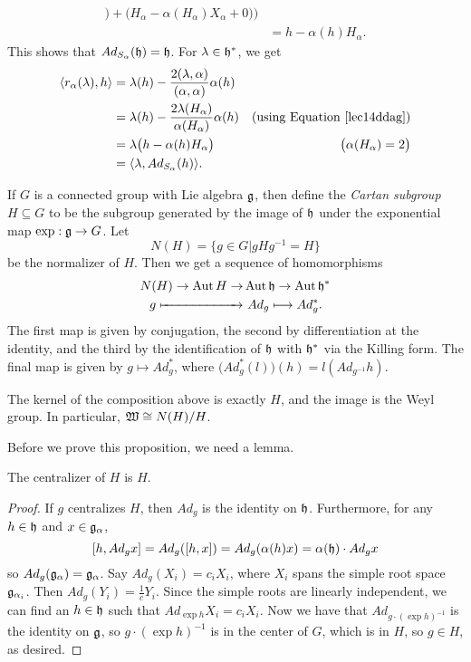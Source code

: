 \begin{exercise}
\begin{solution}
\begin{align*}
           \bigr)+\bigl( H_\alpha - \alpha(H_\alpha)X_\alpha + 0 \bigr)\Bigr)\\
           &= h - \alpha(h)H_\alpha.
     \end{align*}
     This shows that $Ad_{S_\alpha}(\mathfrak{h})=\mathfrak{h}$. For $\lambda\in \mathfrak{h}^*$, we get
     \begin{align*}
       \langle r_\alpha(\lambda),h\rangle &=
       \lambda(h)-\frac{2(\lambda,\alpha)}{(\alpha,\alpha)}\alpha(h)\\
       &= \lambda(h) - \frac{2\lambda(H_\alpha)}{\alpha(H_\alpha)}\alpha(h) &
       \text{(using Equation \ref{lec14ddag})}\\
       &= \lambda\bigl( h - \alpha(h)H_\alpha \bigr) & \bigl( \alpha(H_\alpha)=2 \bigr)\\
       &= \langle \lambda, Ad_{S_\alpha}(h)\rangle.
     \end{align*}
   \end{solution}
 \end{exercise}
 If $G$ is a connected group with Lie algebra $\mathfrak{g}$, then define the \emph{Cartan
 subgroup} $H\subseteq G$ to be the subgroup generated by the
 image of $\mathfrak{h}$ under the exponential map $\exp:\mathfrak{g}\to G$. Let
 \[
    N(H)=\{g\in G|gHg^{-1}=H\}
 \]
 be the normalizer of $H$. Then we get a sequence of homomorphisms
 \begin{align*}
    N(H)\to \operatorname{Aut} H \to &\operatorname{Aut} \mathfrak{h} \to \operatorname{Aut} \mathfrak{h}^*\\
    g\xmapsto{\qquad\qquad\qquad} &\ Ad_g \longmapsto Ad^*_g.
 \end{align*}
 The first map is given by conjugation, the second by differentiation at the identity,
 and the third by the identification of $\mathfrak{h}$ with $\mathfrak{h}^*$ via the Killing form. The
 final map is given by $g\mapsto Ad^*_g$, where
 $\big(Ad^*_g(l)\big)(h)=l(Ad_{g^{-1}}h)$.
 \begin{proposition}\label{lec14P:WeylgpFact}
   The kernel of the composition above is exactly $H$, and the image is the Weyl
   group. In particular, $\mathfrak{W}\cong N(H)/H$.
 \end{proposition}
 Before we prove this proposition, we need a lemma.
 \begin{lemma}\label{lec14L:H=C(H)}
   The centralizer of $H$ is $H$.
 \end{lemma}
 \begin{proof}
   If $g$ centralizes $H$, then $Ad_g$ is the identity on $\mathfrak{h}$. Furthermore, for any
   $h\in \mathfrak{h}$ and $x\in \mathfrak{g}_\alpha$,
   \[
     [h,Ad_g x] = Ad_g([h,x])=Ad_g (\alpha(h) x) = \alpha(\mathfrak{h})\cdot Ad_g x
   \]
   so $Ad_g(\mathfrak{g}_\alpha)=\mathfrak{g}_\alpha$. Say $Ad_g(X_i)=c_iX_i$, where $X_i$ spans the
   simple root space $\mathfrak{g}_{\alpha_i}$. Then $Ad_g(Y_i)=\frac{1}{c}Y_i$. Since the
   simple roots are linearly independent, we can find an $h\in \mathfrak{h}$ such that $Ad_{\exp
   h}X_i=c_iX_i$. Now we have that $Ad_{g\cdot (\exp h)^{-1}}$ is the identity on
   $\mathfrak{g}$, so $g\cdot (\exp h)^{-1}$ is in the center of $G$, which is in $H$, so $g\in H$, as desired.
 \end{proof}
